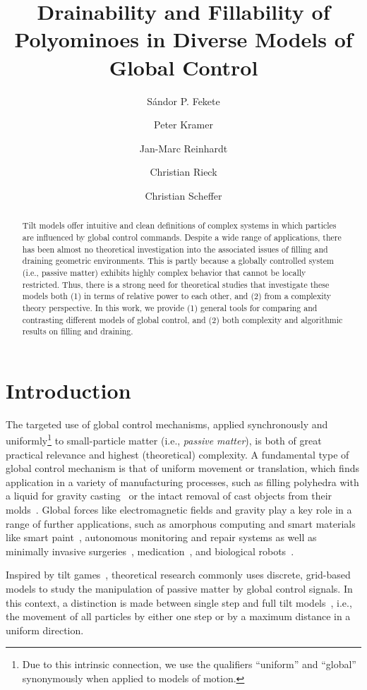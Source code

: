 \documentclass[a4paper,UKenglish,cleveref,thm-restate]{lipics-v2021}
\title{Drainability and Fillability of Polyominoes in Diverse Models of Global Control}
\author{Sándor P. Fekete}{Computer Science, TU Braunschweig, Germany}{s.fekete@tu-bs.de}{https://orcid.org/0000-0002-9062-4241}{}
\author{Peter Kramer}{Computer Science, TU Braunschweig, Germany}{kramer@ibr.cs.tu-bs.de}{https://orcid.org/0000-0001-9635-5890}{}
\author{Jan-Marc Reinhardt}{Electrical Engineering and Computer Science, Bochum University of Applied Sciences, Germany}{jan-marc.reinhardt@hs-bochum.de}{https://orcid.org/0009-0005-8907-3832}{}
\author{Christian Rieck}{Discrete Mathematics, University of Kassel, Germany}{christian.rieck@mathematik.uni-kassel.de}{https://orcid.org/0000-0003-0846-5163}{}
\author{Christian Scheffer}{Electrical Engineering and Computer Science, Bochum University of Applied Sciences, Germany}{christian.scheffer@hs-bochum.de}{https://orcid.org/0000-0002-3471-2706}{}
\begin{document}
    \maketitle

    \begin{abstract}
      Tilt models offer intuitive and clean definitions of complex systems in which particles are influenced by global control commands. 
Despite a wide range of applications, there has been almost no theoretical investigation into the associated issues of filling and draining geometric environments.
This is partly because a globally controlled system (i.e., passive matter) exhibits highly complex behavior that cannot be locally restricted.
Thus, there is a strong need for theoretical studies that investigate these models both (1) in terms of relative power to each other, and (2) from a complexity theory perspective.
In this work, we provide (1) general tools for comparing and contrasting different models of global control, and (2) both complexity and algorithmic results on filling and draining.
     \end{abstract}

    \section{Introduction}
\label{sec:introduction}

The targeted use of global control mechanisms, applied synchronously and uniformly\footnote{Due to this intrinsic connection, we use the qualifiers ``uniform'' and ``global'' synonymously when applied to models of motion.} to small-particle matter (i.e., \emph{passive matter}), is both of great practical relevance and highest (theoretical) complexity.
A fundamental type of global control mechanism is that of uniform movement or translation, which finds application in a variety of manufacturing processes, such as filling polyhedra with a liquid for gravity casting~\cite{BoseT95,BoseKT98,YASUI2015494} or the intact removal of cast objects from their molds~\cite{bfghs2024singlepartmold,bhs2017separation}.
Global forces like electromagnetic fields and gravity play a key role in a range of further applications, such as amorphous computing and smart materials like smart paint~\cite{AbelsonACHHKNRSW00}, autonomous monitoring and repair systems as well as minimally invasive surgeries~\cite{bdflmw-particle2019}, medication~\cite{bflkkkrs-drugdelivery2020}, and biological robots~\cite{becker2013feedback}.

\pagebreak
Inspired by tilt games~\cite{abdelkader20162048,akitaya20212048,DemaineR18},
theoretical research commonly uses discrete, grid-based models to study the manipulation of passive matter by global control signals.
In this context, a distinction is made between single step and full tilt models~\cite{bdflmw-particle2019,caglsw-twodirections2023}, i.e., the movement of all particles by either one step or by a maximum distance in a uniform direction.
\end{document}
